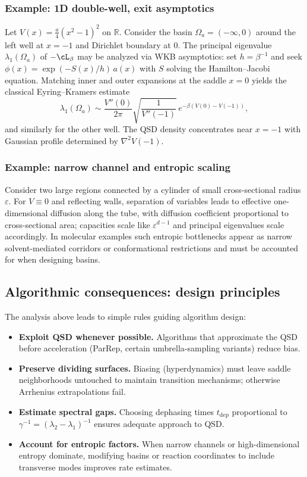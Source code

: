 \subsubsection*{Example: 1D double-well, exit asymptotics}
Let $V(x)=\frac{a}{4}(x^2-1)^2$ on $\mathbb R$. Consider the basin $\Omega_a=(-\infty,0)$ around the left well at $x=-1$ and Dirichlet boundary at $0$. The principal eigenvalue
$\lambda_1(\Omega_a)$ of $-\cL_\beta$ may be analyzed via WKB asymptotics: set $h=\beta^{-1}$ and seek $\phi(x)=\exp(-S(x)/h)\,a(x)$ with $S$ solving the Hamilton--Jacobi equation.
Matching inner and outer expansions at the saddle $x=0$ yields the classical Eyring--Kramers estimate
\[
\lambda_1(\Omega_a) \sim \frac{V''(0)}{2\pi}\sqrt{\frac{1}{V''(-1)}}\,e^{-\beta(V(0)-V(-1))},
\]
and similarly for the other well. The QSD density concentrates near $x=-1$ with Gaussian profile determined by $\nabla^2 V(-1)$.

\subsubsection*{Example: narrow channel and entropic scaling}
Consider two large regions connected by a cylinder of small cross-sectional radius $\varepsilon$. For $V\equiv 0$ and reflecting walls, separation of variables leads to effective one-dimensional diffusion along the tube,
with diffusion coefficient proportional to cross-sectional area; capacities scale like $\varepsilon^{d-1}$ and principal eigenvalues scale accordingly. In molecular examples
such entropic bottlenecks appear as narrow solvent-mediated corridors or conformational restrictions and must be accounted for when designing basins.

\subsection{Algorithmic consequences: design principles}

The analysis above leads to simple rules guiding algorithm design:

\begin{itemize}
    \item \textbf{Exploit QSD whenever possible.} Algorithms that approximate the QSD before acceleration (ParRep, certain umbrella-sampling variants) reduce bias.
    \item \textbf{Preserve dividing surfaces.} Biasing (hyperdynamics) must leave saddle neighborhoods untouched to maintain transition mechanisms; otherwise Arrhenius extrapolations fail.
    \item \textbf{Estimate spectral gaps.} Choosing dephasing times $t_{\mathrm{dep}}$ proportional to $\gamma^{-1}=(\lambda_2-\lambda_1)^{-1}$ ensures adequate approach to QSD.
    \item \textbf{Account for entropic factors.} When narrow channels or high-dimensional entropy dominate, modifying basins or reaction coordinates to include transverse modes improves rate estimates.
\end{itemize}

